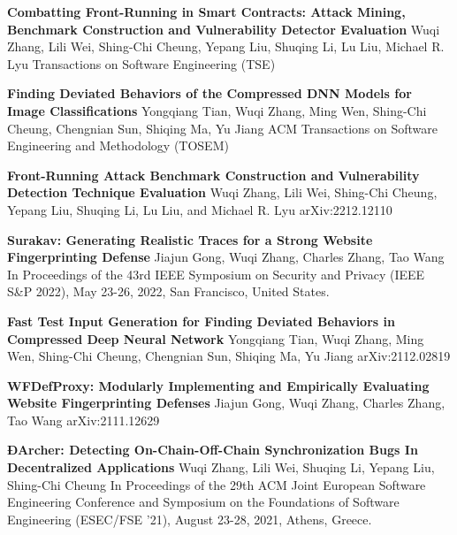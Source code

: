 %
%
%


\begin{scholarship}
	{\textbf{Combatting Front-Running in Smart Contracts: Attack Mining, Benchmark Construction and Vulnerability Detector Evaluation}}
	{Wuqi Zhang, Lili Wei, Shing-Chi Cheung, Yepang Liu, Shuqing Li, Lu Liu, Michael R. Lyu}
	\scholarshipentry{}
	{Transactions on Software Engineering (TSE)}

	{\textbf{Finding Deviated Behaviors of the Compressed DNN Models for Image Classifications}}
	{Yongqiang Tian, Wuqi Zhang, Ming Wen, Shing-Chi Cheung, Chengnian Sun, Shiqing Ma, Yu Jiang}
	\scholarshipentry{}
	{ACM Transactions on Software Engineering and Methodology (TOSEM)}

	{\textbf{Front-Running Attack Benchmark Construction and Vulnerability Detection Technique Evaluation}}
	{Wuqi Zhang, Lili Wei, Shing-Chi Cheung, Yepang Liu, Shuqing Li, Lu Liu, and Michael R. Lyu}
	\scholarshipentry{}
	{arXiv:2212.12110}

	{\textbf{Surakav: Generating Realistic Traces for a Strong Website Fingerprinting Defense}}
	{Jiajun Gong, Wuqi Zhang, Charles Zhang, Tao Wang}
	\scholarshipentry{}
	{In Proceedings of the 43rd IEEE Symposium on Security and Privacy (IEEE S\&P 2022), May 23-26, 2022, San Francisco, United States.}

	{\textbf{Fast Test Input Generation for Finding Deviated Behaviors in Compressed Deep Neural Network}}
	{Yongqiang Tian, Wuqi Zhang, Ming Wen, Shing-Chi Cheung, Chengnian Sun, Shiqing Ma, Yu Jiang}
	\scholarshipentry{}
	{arXiv:2112.02819}

	{\textbf{WFDefProxy: Modularly Implementing and Empirically Evaluating Website Fingerprinting Defenses}}
	{Jiajun Gong, Wuqi Zhang, Charles Zhang, Tao Wang}
	\scholarshipentry{}
	{arXiv:2111.12629}

	{\textbf{ÐArcher: Detecting On-Chain-Off-Chain Synchronization Bugs In Decentralized Applications}}
	{Wuqi Zhang, Lili Wei, Shuqing Li, Yepang Liu, Shing-Chi Cheung}
	\scholarshipentry{}
	{In Proceedings of the 29th ACM Joint European Software Engineering Conference and Symposium on the Foundations of Software Engineering (ESEC/FSE '21), August 23-28, 2021, Athens, Greece.}


\end{scholarship}
